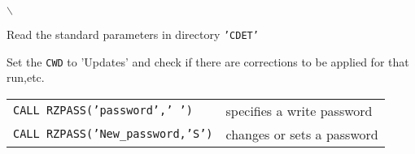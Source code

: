 \batchmode

\makeatletter
\makeindex
\newcommand{\FZfile}{FZ~file\index{FZ!Sequential input/output}\index{input/output!FZ}}
\newcommand{\RZfile}{RZ~file\index{RZ!Random input/output}\index{input/output!RZ}}
\newcommand{\IQUEST}{\Lit{IQUEST}\index{IQUEST@{\tt IQUEST}!user communication vector in common {\tt QUEST}}\index{IQUEST@{\tt IQUEST}!error reporting}\index{error reporting!{\tt IQUEST}}\index{QUEST@{\tt QUEST}!user communication common}}
\newcommand{\QUEST}{\Lit{QUEST}\index{IQUEST@{\tt IQUEST}!user communication vector in common {\tt QUEST}}\index{IQUEST@{\tt IQUEST}!error reporting}\index{error reporting!{\tt IQUEST}}\index{QUEST@{\tt QUEST}!user communication common}}
\renewcommand{\ZEBRA}{\textsc{ZEBRA}}
\renewcommand{\Copt}[1]{\texttt{#1}}
\renewcommand{\Ropt}[1]{\texttt{#1}}
\renewcommand{\Rarg}[1]{\texttt{#1}}
\def\condbreak#1{}
\setlongtables
\makeindex
{}
\PScommands\setcounter{secnumdepth}{3}
\setcounter{tocdepth}{2}
\newenvironment{landscapebody}{\begin{landscape}}{\end{landscape}}
\makeatletter
\def\LS@rot{\setbox\@outputbox=\vbox{\@rotr\@outputbox}}
\makeatother
\long{}
\renewcommand{\ZEBRA}{\textsc{ZEBRA}}\renewcommand{\Copt}[1]{\texttt{#1}}\renewcommand{\Ropt}[1]{\texttt{#1}}\renewcommand{\Rarg}[1]{\texttt{#1}}\def\condbreak#1{}\def\LS@rot{\setbox\@outputbox=\vbox{\@rotr\@outputbox}}\def\NODOC#1{#1}
\makeatother
\newenvironment{tex2html_wrap}{}{}
\usepackage{screen}

\pagestyle{empty}
\newpage

{\samepage \clearpage $\backslash$
}


\newpage

{\samepage \clearpage \begin{UL}\item Read the standard parameters in directory {\tt'CDET'}
\item Set the {\tt CWD} to 'Updates' and check if there are corrections
to be applied for that run,etc.
\end{UL}
}


\newpage

{\samepage \clearpage \begin{tabular}[t]{>{\tt}l@{\qquad}l}
CALL RZPASS('password',' ')   & specifies a write password \\  [2mm]
CALL RZPASS('New\_password,'S')& changes or sets a password
\end{tabular}
}


